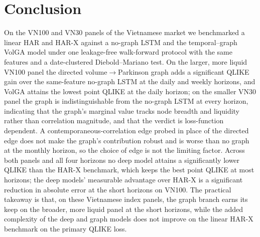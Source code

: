 \documentclass[runningheads]{llncs}
\begin{document}
\section{Conclusion}
On the VN100 and VN30 panels of the Vietnamese market we benchmarked a linear HAR and HAR-X against a
no-graph LSTM and the temporal--graph VolGA model under one leakage-free walk-forward protocol with
the same features and a date-clustered Diebold--Mariano test. On the larger, more liquid VN100 panel
the directed volume$\to$Parkinson graph adds a significant QLIKE gain over the same-feature no-graph
LSTM at the daily and weekly horizons, and VolGA attains the lowest point QLIKE at the daily horizon;
on the smaller VN30 panel the graph is indistinguishable from the no-graph LSTM at every horizon,
indicating that the graph's marginal value tracks node breadth and liquidity rather than correlation
magnitude, and that the verdict is loss-function dependent. A contemporaneous-correlation edge probed
in place of the directed edge does not make the graph's contribution robust and is worse than no graph
at the monthly horizon, so the choice of edge is not the limiting factor. Across both panels and all
four horizons no deep model attains a significantly lower QLIKE than the HAR-X benchmark, which keeps
the best point QLIKE at most horizons; the deep models' measurable advantage over HAR-X is a
significant reduction in absolute error at the short horizons on VN100. The practical takeaway is
that, on these Vietnamese index panels, the graph branch earns its keep on the broader, more liquid
panel at the short horizons, while the added complexity of the deep and graph models does not improve
on the linear HAR-X benchmark on the primary QLIKE loss.
\end{document}
